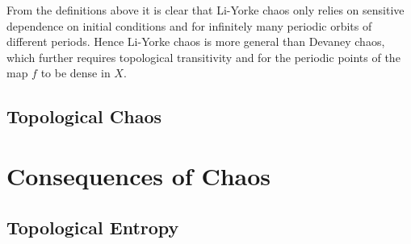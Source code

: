 \documentclass[11pt,a4paper,oneside]{memoir}
\theoremstyle{plain}
\theoremstyle{definition}
\begin{document}
From the definitions above it is clear that Li-Yorke chaos only relies on sensitive dependence on initial conditions and for infinitely many periodic orbits of different periods. Hence Li-Yorke chaos is more general than Devaney chaos, which further requires topological transitivity and for the periodic points of the map $f$ to be dense in $X$.

\section{Topological Chaos} \label{sec:topological-chaos}

\chapter{Consequences of Chaos}

\section{Topological Entropy}



\end{document}
